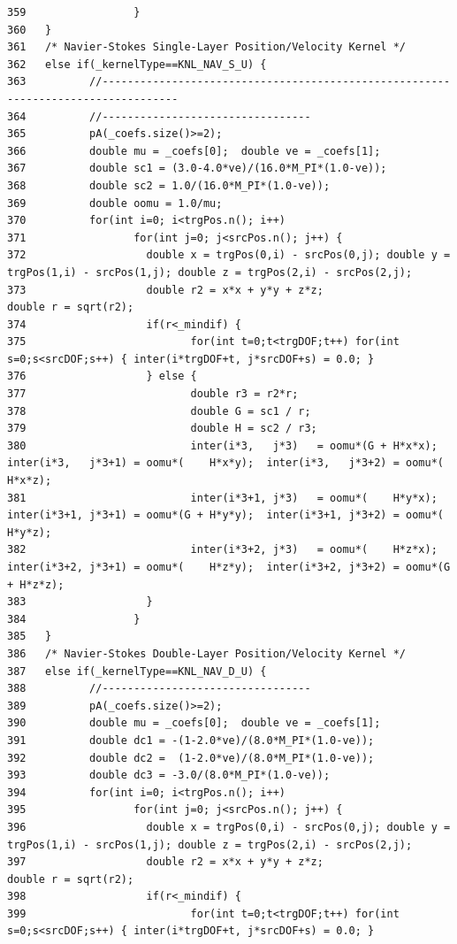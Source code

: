 \begin{verbatim}
359                 }
360   }
361   /* Navier-Stokes Single-Layer Position/Velocity Kernel */
362   else if(_kernelType==KNL_NAV_S_U) {
363          //----------------------------------------------------------------------------------
364          //---------------------------------
365          pA(_coefs.size()>=2);
366          double mu = _coefs[0];  double ve = _coefs[1];
367          double sc1 = (3.0-4.0*ve)/(16.0*M_PI*(1.0-ve));
368          double sc2 = 1.0/(16.0*M_PI*(1.0-ve));
369          double oomu = 1.0/mu;
370          for(int i=0; i<trgPos.n(); i++)
371                 for(int j=0; j<srcPos.n(); j++) {
372                   double x = trgPos(0,i) - srcPos(0,j); double y = trgPos(1,i) - srcPos(1,j); double z = trgPos(2,i) - srcPos(2,j);
373                   double r2 = x*x + y*y + z*z;                    double r = sqrt(r2);
374                   if(r<_mindif) {
375                          for(int t=0;t<trgDOF;t++) for(int s=0;s<srcDOF;s++) { inter(i*trgDOF+t, j*srcDOF+s) = 0.0; }
376                   } else {
377                          double r3 = r2*r;
378                          double G = sc1 / r;
379                          double H = sc2 / r3;
380                          inter(i*3,   j*3)   = oomu*(G + H*x*x);  inter(i*3,   j*3+1) = oomu*(    H*x*y);  inter(i*3,   j*3+2) = oomu*(    H*x*z);
381                          inter(i*3+1, j*3)   = oomu*(    H*y*x);  inter(i*3+1, j*3+1) = oomu*(G + H*y*y);  inter(i*3+1, j*3+2) = oomu*(    H*y*z);
382                          inter(i*3+2, j*3)   = oomu*(    H*z*x);  inter(i*3+2, j*3+1) = oomu*(    H*z*y);  inter(i*3+2, j*3+2) = oomu*(G + H*z*z);
383                   }
384                 }
385   }
386   /* Navier-Stokes Double-Layer Position/Velocity Kernel */
387   else if(_kernelType==KNL_NAV_D_U) {
388          //---------------------------------
389          pA(_coefs.size()>=2);
390          double mu = _coefs[0];  double ve = _coefs[1];
391          double dc1 = -(1-2.0*ve)/(8.0*M_PI*(1.0-ve));
392          double dc2 =  (1-2.0*ve)/(8.0*M_PI*(1.0-ve));
393          double dc3 = -3.0/(8.0*M_PI*(1.0-ve));
394          for(int i=0; i<trgPos.n(); i++)
395                 for(int j=0; j<srcPos.n(); j++) {
396                   double x = trgPos(0,i) - srcPos(0,j); double y = trgPos(1,i) - srcPos(1,j); double z = trgPos(2,i) - srcPos(2,j);
397                   double r2 = x*x + y*y + z*z;                    double r = sqrt(r2);
398                   if(r<_mindif) {
399                          for(int t=0;t<trgDOF;t++) for(int s=0;s<srcDOF;s++) { inter(i*trgDOF+t, j*srcDOF+s) = 0.0; }

\end{verbatim}
